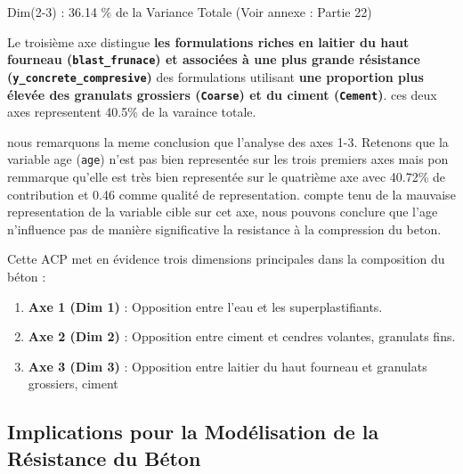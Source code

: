 \documentclass[
  12pt,
]{article}
\providecommand{\tightlist}{%
  \setlength{\itemsep}{0pt}\setlength{\parskip}{0pt}}
\begin{document}
Dim(2-3) : 36.14 \% de la Variance Totale (Voir annexe : Partie 22)

Le troisième axe distingue \textbf{les formulations riches en laitier du
haut fourneau (\texttt{blast\_frunace}) et associées à une plus grande
résistance (\texttt{y\_concrete\_compresive})} des formulations
utilisant \textbf{une proportion plus élevée des granulats grossiers
(\texttt{Coarse}) et du ciment (\texttt{Cement})}. ces deux axes
representent 40.5\% de la varaince totale.

nous remarquons la meme conclusion que l'analyse des axes 1-3. Retenons
que la variable age (\texttt{age}) n'est pas bien representée sur les
trois premiers axes mais pon remmarque qu'elle est très bien representée
sur le quatrième axe avec 40.72\% de contribution et 0.46 comme qualité
de representation. compte tenu de la mauvaise representation de la
variable cible sur cet axe, nous pouvons conclure que l'age n'influence
pas de manière significative la resistance à la compression du beton.

Cette ACP met en évidence trois dimensions principales dans la
composition du béton :

\begin{enumerate}
\def\labelenumi{\arabic{enumi}.}
\tightlist
\item
  \textbf{Axe 1 (Dim 1)} : Opposition entre l'eau et les
  superplastifiants.
\item
  \textbf{Axe 2 (Dim 2)} : Opposition entre ciment et cendres volantes,
  granulats fins.
\item
  \textbf{Axe 3 (Dim 3)} : Opposition entre laitier du haut fourneau et
  granulats grossiers, ciment
\end{enumerate}

\subsection{Implications pour la Modélisation de la Résistance du
Béton}\label{implications-pour-la-moduxe9lisation-de-la-ruxe9sistance-du-buxe9ton}
\end{document}
